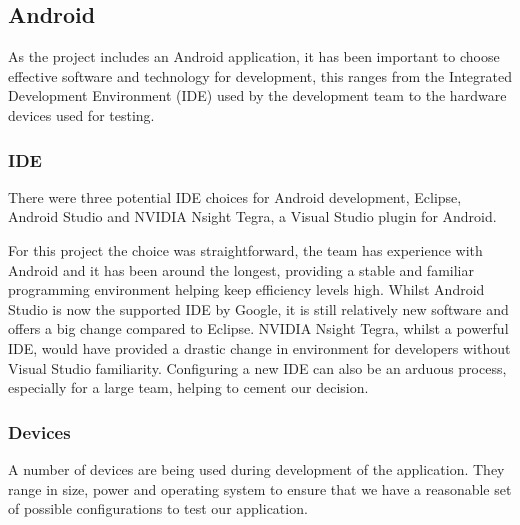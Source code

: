 \documentclass[11pt,a4paper]{article}
\begin{document}
\subsection{Android}
\label{sec:android-tech-choices}
As the project includes an Android application, it has been important to choose effective software and technology for development, this ranges from the Integrated Development Environment (IDE) used by the development team to the hardware devices used for testing.

\subsubsection{IDE}
There were three potential IDE choices for Android development, Eclipse, Android Studio and NVIDIA Nsight Tegra, a Visual Studio plugin for Android.

For this project the choice was straightforward, the team has experience with Android and it has been around the longest, providing a stable and familiar programming environment helping keep efficiency levels high. Whilst Android Studio is now the supported IDE by Google, it is still relatively new software and offers a big change compared to Eclipse. NVIDIA Nsight Tegra, whilst a powerful IDE, would have provided a drastic change in environment for developers without Visual Studio familiarity. Configuring a new IDE can also be an arduous process, especially for a large team, helping to cement our decision.

\subsubsection{Devices}
A number of devices are being used during development of the application. They range in size, power and operating system to ensure that we have a reasonable set of possible configurations to test our application.
\end{document}

